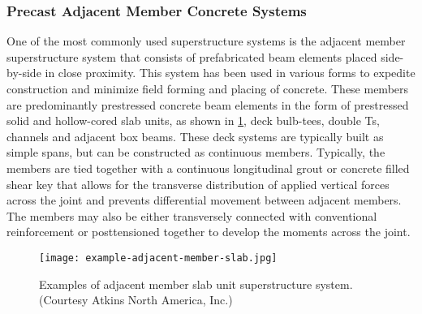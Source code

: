 \subsubsection{Precast Adjacent Member Concrete Systems}
One of the most commonly used superstructure systems is the adjacent member superstructure system that consists of prefabricated beam elements placed side-by-side in close proximity. This system has been used in various forms to expedite construction and minimize field forming and placing of concrete. These members are predominantly prestressed concrete beam elements in the form of prestressed solid and hollow-cored slab units, as shown in \cref{fig:example-adjacent-member-slab}, deck bulb-tees, double Ts, channels and adjacent box beams. These deck systems are typically built as simple spans, but can be constructed as continuous members. Typically, the members are tied together with a continuous longitudinal grout or concrete filled shear key that allows for the transverse distribution of applied vertical forces across the joint and prevents differential movement between adjacent members. The members may also be either transversely connected with conventional reinforcement or posttensioned together to develop the moments across the joint.

\begin{figure}
  \texttt{[image: example-adjacent-member-slab.jpg]}
  \caption{Examples of adjacent member slab unit superstructure system. (Courtesy Atkins North America, Inc.)}
  \label{fig:example-adjacent-member-slab}
\end{figure}

